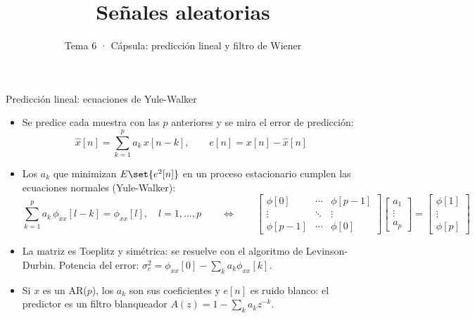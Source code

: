 \documentclass[aspectratio=169,11pt]{beamer}
\title[T6 · Predicción y Wiener]{Señales aleatorias}
\subtitle{Tema 6 · Cápsula: predicción lineal y filtro de Wiener}
\begin{document}
\portada

\begin{frame}{Predicción lineal: ecuaciones de Yule-Walker}
  \footnotesize
  \begin{itemize}
    \item Se predice cada muestra con las $p$ anteriores y se mira el \alert{error de predicción}:
    \[
      \hat x[n]=\sum_{k=1}^{p}a_k\,x[n-k],\qquad e[n]=x[n]-\hat x[n]
    \]
    \item Los $a_k$ que minimizan $E\set{e^2[n]}$ en un proceso estacionario cumplen las \alert{ecuaciones normales} (Yule-Walker):
    \[
      \sum_{k=1}^{p}a_k\,\phi_{xx}[l-k]=\phi_{xx}[l],\quad l=1,\dots,p
      \qquad\Longleftrightarrow\qquad
      \begin{bmatrix}\phi[0]&\cdots&\phi[p-1]\\ \vdots&\ddots&\vdots\\ \phi[p-1]&\cdots&\phi[0]\end{bmatrix}
      \begin{bmatrix}a_1\\ \vdots\\ a_p\end{bmatrix}=
      \begin{bmatrix}\phi[1]\\ \vdots\\ \phi[p]\end{bmatrix}
    \]
    \item La matriz es Toeplitz y simétrica: se resuelve con el algoritmo de Levinson-Durbin. Potencia del error: $\sigma_e^2=\phi_{xx}[0]-\sum_k a_k\phi_{xx}[k]$.
    \item Si $x$ es un AR($p$), los $a_k$ son sus coeficientes y $e[n]$ es \alert{ruido blanco}: el predictor es un filtro \alert{blanqueador} $A(z)=1-\sum_k a_kz^{-k}$.
  \end{itemize}
\end{frame}
\end{document}
